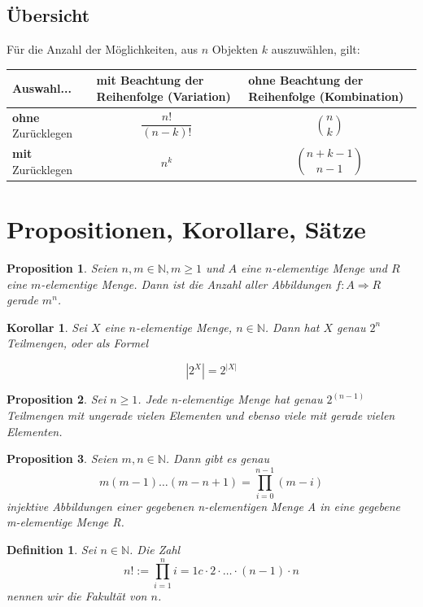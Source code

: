 \documentclass[12pt, twoside]{article}
\newcommand{\N}{\mathbb{N}}
\newtheorem{Kor}{Korollar}[subsection]
\newtheorem{Prop}{Proposition}[subsection]
\newtheorem{Def}{Definition}[subsection]
\begin{document}
\subsection{Übersicht}
Für die Anzahl der Möglichkeiten, aus $n$ Objekten $k$ auszuwählen, gilt: \\


\begin{centering}
\begin{tabular}{l||p{4.5cm}|p{4.5cm}}
Auswahl... & \textbf{mit} Beachtung der Reihenfolge (Variation) & \textbf{ohne} Beachtung der Reihenfolge (Kombination) \\
\hline
\hline
\textbf{ohne} Zurücklegen &  $$\frac{n!}{(n-k)!}$$  & $$\binom{n}{k}$$  \\
\hline
\textbf{mit} Zurücklegen & $$n^k$$ & $$\binom{n+k-1}{n-1}$$ \\

\end{tabular}
\end{centering}


\section{Propositionen, Korollare, Sätze}
\begin{Prop} Seien $n, m \in \N, m \ge 1$ und $A$ eine $n$-elementige Menge und $R$ eine $m$-elementige Menge. Dann ist die 
Anzahl aller Abbildungen $f:A \Rightarrow R$ gerade $m^n$.
\end{Prop}
\begin{Kor} 
Sei $X$ eine $n$-elementige Menge, $n \in \N$. Dann hat $X$ genau $2^n$ Teilmengen, oder als Formel
\end{Kor}
$$|2^X|=2^{|X|}$$





\begin{Prop} Sei  $n \ge 1$. Jede n-elementige Menge hat genau $2^{(n-1)}$ Teilmengen mit ungerade vielen Elementen und 
ebenso viele mit gerade vielen Elementen. 
\end{Prop}

\begin{Prop} Seien $m, n \in \N $. Dann gibt es genau 
$$
m(m-1)\dots (m-n+1)= \prod_{i=0}^{n-1} (m-i)
$$
injektive Abbildungen einer gegebenen n-elementigen Menge A in eine gegebene m-elementige Menge R.
\end{Prop}

\begin{Def} Sei $n \in \N$. Die Zahl
$$
n!:= \prod_{i=1}^{n}i=1c\cdot 2 \cdot \ldots \cdot(n-1)\cdot n
$$
nennen wir die Fakultät von $n$.
\end{Def}
\end{document}
